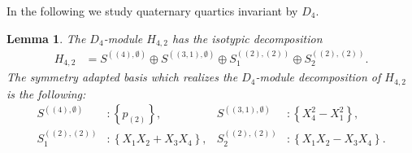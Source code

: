 \documentclass[11pt,a4paper]{amsart}
\numberwithin{equation}{section}
\newtheorem{lemma}[thm]{Lemma}
\theoremstyle{definition}
\numberwithin{thm}{section}
\theoremstyle{break}
\numberwithin{subcase}{case}
\begin{document}
In the following we study quaternary quartics invariant by $D_4$.
\begin{lemma} \label{le:D4isodecomp}
The $D_4$-module $H_{4,2}$ has the isotypic decomposition \begin{align*}
H_{4,2} & =  S^{((4),\emptyset)} \oplus S^{((3,1),\emptyset)} \oplus S_1^{((2),(2))} \oplus S_2^{((2),(2))}.    
\end{align*}
The symmetry adapted basis which realizes the $D_4$-module decomposition of $H_{4,2}$ is the following:
\begin{align*}
 S^{((4),\emptyset)} & : \left\{p_{(2)}\right\},& 
 S^{((3,1),\emptyset)} & :\left\{ X_4^2-X_1^2\right\}, \\
 S^{((2),(2))}_1   & : \left\{X_1X_2+X_3X_4\right\}, &
S^{((2),(2))}_2   & : \left\{X_1X_2-X_3X_4\right\}.
\end{align*}
\end{lemma}
\end{document}
